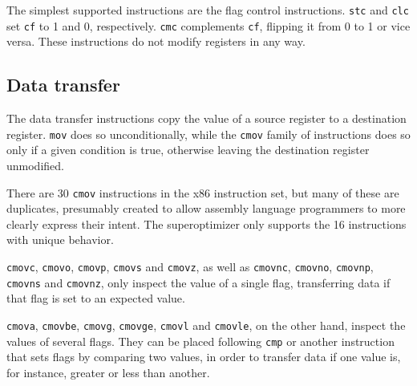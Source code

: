 \documentclass[a4paper,11pt]{kth-mag}
\begin{document}
The simplest supported instructions are the flag control instructions.
\verb|stc| and \verb|clc| set \verb|cf| to 1 and 0, respectively.
\verb|cmc| complements \verb|cf|, flipping it from 0 to 1 or vice versa.
These instructions do not modify registers in any way.

\subsection{Data transfer}

The data transfer instructions copy the value of a source register to a destination register.
\verb|mov| does so unconditionally, while the \verb|cmov| family of instructions does so only if a given condition is true, otherwise leaving the destination register unmodified.

There are 30 \verb|cmov| instructions in the x86 instruction set, but many of these are duplicates, presumably created to allow assembly language programmers to more clearly express their intent.
The superoptimizer only supports the 16 instructions with unique behavior.

\verb|cmovc|, \verb|cmovo|, \verb|cmovp|, \verb|cmovs| and \verb|cmovz|, as well as \verb|cmovnc|, \verb|cmovno|, \verb|cmovnp|, \verb|cmovns| and \verb|cmovnz|, only inspect the value of a single flag, transferring data if that flag is set to an expected value.

\verb|cmova|, \verb|cmovbe|, \verb|cmovg|, \verb|cmovge|, \verb|cmovl| and \verb|cmovle|, on the other hand, inspect the values of several flags.
They can be placed following \verb|cmp| or another instruction that sets flags by comparing two values, in order to transfer data if one value is, for instance, greater or less than another.


\end{document}
